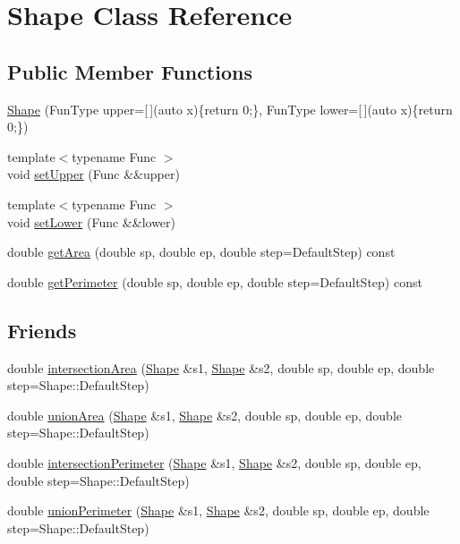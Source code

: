 \hypertarget{class_shape}{}\section{Shape Class Reference}
\label{class_shape}
\subsection*{Public Member Functions}
\begin{DoxyCompactItemize}
\item 
\hyperlink{class_shape_a2274ccda8fc9c57d30e4613f5a4893a4}{Shape} (Fun\+Type upper=\mbox{[}$\,$\mbox{]}(auto x)\{return 0;\}, Fun\+Type lower=\mbox{[}$\,$\mbox{]}(auto x)\{return 0;\})
\item 
{\footnotesize template$<$typename Func $>$ }\\void \hyperlink{class_shape_a46823604a0bf2242340773d188151342}{set\+Upper} (Func \&\&upper)
\item 
{\footnotesize template$<$typename Func $>$ }\\void \hyperlink{class_shape_aef00fbc796cbac641d790791919f1bcb}{set\+Lower} (Func \&\&lower)
\item 
double \hyperlink{class_shape_a0ca8cbfa05bdff9702e17d070af0badc}{get\+Area} (double sp, double ep, double step=Default\+Step) const
\item 
double \hyperlink{class_shape_aed3f92132aa5c78f59946ef2b4aeac2b}{get\+Perimeter} (double sp, double ep, double step=Default\+Step) const
\end{DoxyCompactItemize}
\subsection*{Friends}
\begin{DoxyCompactItemize}
\item 
double \hyperlink{class_shape_ab78c805dcbe5ce07ec7407b55e90d8d5}{intersection\+Area} (\hyperlink{class_shape}{Shape} \&s1, \hyperlink{class_shape}{Shape} \&s2, double sp, double ep, double step=Shape\+::\+Default\+Step)
\item 
double \hyperlink{class_shape_acc80f4bfd96418973e2fa339a00511af}{union\+Area} (\hyperlink{class_shape}{Shape} \&s1, \hyperlink{class_shape}{Shape} \&s2, double sp, double ep, double step=Shape\+::\+Default\+Step)
\item 
double \hyperlink{class_shape_a7c2f955e17b14abbbff05e3adc2fc6a7}{intersection\+Perimeter} (\hyperlink{class_shape}{Shape} \&s1, \hyperlink{class_shape}{Shape} \&s2, double sp, double ep, double step=Shape\+::\+Default\+Step)
\item 
double \hyperlink{class_shape_a207dc66677f37ebecd053cb8ca974fae}{union\+Perimeter} (\hyperlink{class_shape}{Shape} \&s1, \hyperlink{class_shape}{Shape} \&s2, double sp, double ep, double step=Shape\+::\+Default\+Step)
\end{DoxyCompactItemize}


